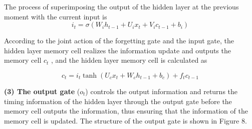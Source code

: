 \documentclass{mcmthesis}
\begin{document}
\begin{figure}[H]
	\centering
\end{figure}

The process of superimposing the output of the hidden layer at the previous moment with the current input is
\begin{equation}
	i_t=\sigma(W_ih_{t-1}+U_ix_t+V_ic_{t-1}+b_i)
\end{equation}

According to the joint action of the forgetting gate and the input gate, the hidden layer memory cell realizes the information update and outputs the memory cell $ c_t $ , and the hidden layer memory cell is calculated as

\begin{equation}
	c_t= i_t \tanh(U_cx_t+W_ch_{t-1}+b_c)+f_tc_{t-1}
\end{equation}

\textbf{(3) The output gate} ($ o_t $) controls the output information and returns the timing information of the hidden layer through the output gate before the memory cell outputs the information, thus ensuring that the information of the memory cell is updated. The structure of the output gate is shown in Figure 8.
\end{document}
